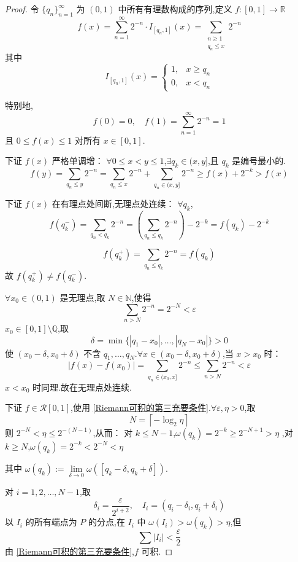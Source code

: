\begin{proof}
	令 $\{q_n\}_{n=1}^\infty$ 为 $(0,1)$ 中所有有理数构成的序列,定义 $f: [0,1] \to \mathbb{R}$
	\[
	f(x) = \sum_{n=1}^\infty 2^{-n} \cdot I_{[q_n,1]}(x) = \sum_{\substack{n \ge 1 \\ q_n \le x}} 2^{-n}
	\]
	其中
	\[
	I_{[q_n,1]}(x) = 
	\begin{cases}
		1, & x \ge q_n \\
		0, & x < q_n
	\end{cases}
	\]
	
	特别地,
	\[
	f(0) = 0, \quad f(1) = \sum_{n=1}^\infty 2^{-n} = 1
	\]
	且 $0 \le f(x) \le 1$ 对所有 $x \in [0,1]$.
	
	下证 $f(x)$ 严格单调增：
	$\forall 0 \le x < y \le 1$,$\exists q_k \in (x,y]$,且 $q_k$ 是编号最小的.
	\[
	f(y) = \sum_{q_n \le y} 2^{-n} = \sum_{q_n \le x} 2^{-n} + \sum_{q_n \in (x,y]} 2^{-n} \ge f(x) + 2^{-k} > f(x)
	\]
	
	下证 $f(x)$ 在有理点处间断,无理点处连续：
	$\forall q_k$,
	\[
	f(q_k^-) = \sum_{q_n < q_k} 2^{-n} = \left( \sum_{q_n \le q_k} 2^{-n} \right) - 2^{-k} = f(q_k) - 2^{-k}
	\]
	
	\[
	f(q_k^+) = \sum_{q_n \le q_k} 2^{-n} = f(q_k)
	\]
	故 \(f(q_k^+) \ne f(q_k^-)\).
	
	\(\forall x_0 \in (0,1)\) 是无理点,取 \(N \in \mathbb{N}\),使得
	\[
	\sum_{n > N} 2^{-n} = 2^{-N} < \varepsilon
	\]
	\(x_0 \in [0,1] \setminus \mathbb{Q}\),取
	\[
	\delta = \min\{|q_1 - x_0|, \dots, |q_N - x_0|\} > 0
	\]
	使 \((x_0-\delta, x_0+\delta)\) 不含 \(q_1, \dots, q_N\).\(\forall x \in (x_0-\delta, x_0+\delta)\),当 \(x > x_0\) 时：
	\[
	|f(x) - f(x_0)| = \sum_{q_n \in (x_0, x]} 2^{-n} \le \sum_{n > N} 2^{-n} < \varepsilon
	\]
	\(x < x_0\) 时同理.故在无理点处连续.
	
	下证 \(f \in \mathcal{R}[0,1]\),使用 \ref{Riemann可积的第三充要条件}.\(\forall \varepsilon, \eta > 0\),取
	\[
	N = \left\lceil -\log_2 \eta \right\rceil
	\]
	则 \(2^{-N} < \eta \le 2^{-(N-1)}\),从而：
	对 \(k \le N-1\),\(\omega(q_k) = 2^{-k} \ge 2^{-N+1} > \eta\)
	,对 \(k \ge N\),\(\omega(q_k) = 2^{-k} < 2^{-N} < \eta\)
	
	其中 \(\omega(q_k) := \lim\limits_{\delta \to 0} \omega([q_k-\delta, q_k+\delta])\).
	
	对 \(i=1,2,\dots,N-1\),取
	\[
	\delta_i = \frac{\varepsilon}{2^{i+2}}, \quad I_i = (q_i - \delta_i, q_i + \delta_i)
	\]
	以 \(I_i\) 的所有端点为 \(P\) 的分点,在 \(I_i\) 中 \(\omega(I_i) > \omega(q_k) > \eta\),但
	\[
	\sum |I_i| < \frac{\varepsilon}{2}
	\]
	由 \ref{Riemann可积的第三充要条件},\(f\) 可积.
\end{proof}


